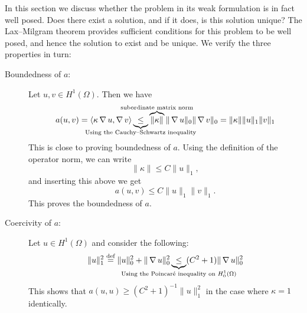 In this section we discuss whether the problem in its weak formulation is
in fact well posed. Does there exist a solution, and if it does, is this
solution unique? The Lax--Milgram theorem provides sufficient conditions for
this problem to be well posed, and hence the solution to exist and be unique.
We verify the three properties in turn:
\begin{description}
    \item[Boundedness of \( a \):]
        Let \( u, v \in H^1(\Omega) \). Then we have
        \begin{equation}
            a(u, v) = \langle \kappa \grad u, \grad v\rangle
            \underbrace{\leq}_{\mathclap{\text{Using the Cauchy--Schwartz inequality}}} 
            \overbrace{\|\kappa\|}^{\mathclap{\text{subordinate matrix norm}}} 
            \| \grad u \|_0 \| \grad v \|_0
            = \|\kappa\| \| u \|_1 \| v \|_1
        \end{equation}
        This is close to proving boundedness of \( a \). Using the definition
        of the operator norm, we can write
        \begin{equation}
            \| \kappa \| \leq C \| u \|_1, 
        \end{equation}
        and inserting this above we get
        \begin{equation}
            a(u, v) \leq C \| u \|_1 \| v\|_1.
        \end{equation}
        This proves the boundedness of \( a \).

    \item[Coercivity of \(a \):]
        Let \( u \in H^1 (\Omega) \) and consider the following:
        \begin{equation}
            \| u \|_1^2 \overset{\text{def}}{=} \| u \|_0^2 + \| \grad u \|_0^2
            \underbrace{\leq}_{\mathclap{\text{Using the Poincar\'e inequality
            on } H^1_0(\Omega)}} (C^2 + 1) \| \grad u \|_0^2
        \end{equation}
        This shows that \( a(u, u) \geq (C^2 + 1)^{-1} \| u \|_1^2 \) in the
        case where \( \kappa = 1 \) identically. 


\end{description}
